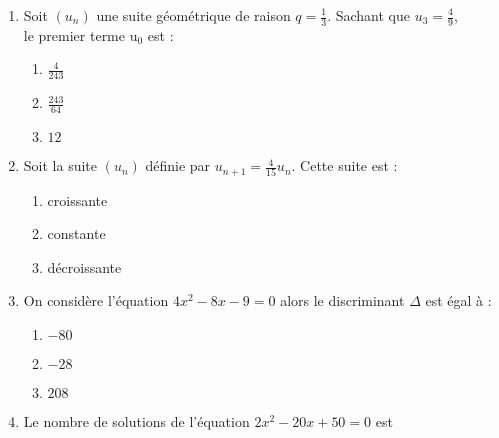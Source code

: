\documentclass[oneside,twocolumn,landscape]{book}
\begin{document}
\begin{enumerate}
\begin{enumerate}
\end{enumerate}



\item Soit $\left(u_{n}\right)$ une suite géométrique de raison $q=\frac{1}{3}$. Sachant que $u_{3}=\frac{4}{9}$,\\ le premier terme $\mathrm{u}_ {0}$ est :

\begin{enumerate}


\item\MauvaiseReponse $\frac{4}{243}$

\item\MauvaiseReponse $\frac{243}{64}$

\item\BonneReponse $12$

\end{enumerate}





\item Soit la suite $\left(u_{n}\right)$ définie par $u_{n+1}=\frac{4}{15}u_n$. Cette suite est :

\begin{enumerate}

\item\MauvaiseReponse croissante


\item\MauvaiseReponse constante

\item\BonneReponse décroissante

\end{enumerate}

\newpage


\item On considère l'équation $4x^{2}-8 x-9=0$ alors le discriminant $\Delta$ est égal à :

\begin{enumerate}


\item\MauvaiseReponse $-80$

\item\MauvaiseReponse $-28$

\item\BonneReponse $208$

\end{enumerate}



\item Le nombre de solutions de l'équation $2x^{2}-20 x+50=0$ est


\end{enumerate}
\end{document}
